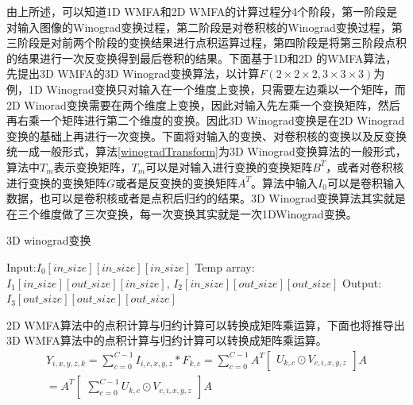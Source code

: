 由上所述，可以知道1D WMFA和2D WMFA的计算过程分4个阶段，第一阶段是对输入图像的Winograd变换过程，第二阶段是对卷积核的Winograd变换过程，第三阶段是对前两个阶段的变换结果进行点积运算过程，第四阶段是将第三阶段点积的结果进行一次反变换得到最后卷积的结果。下面基于1D和2D 的WMFA算法，先提出3D WMFA的3D Winograd变换算法，以计算$F(2\times 2 \times 2, 3 \times 3\times 3)$为例，1D Winograd变换只对输入在一个维度上变换，只需要左边乘以一个矩阵，而2D Winorad变换需要在两个维度上变换，因此对输入先左乘一个变换矩阵，然后再右乘一个矩阵进行第二个维度的变换。因此3D Winograd变换是在2D Winograd变换的基础上再进行一次变换。下面将对输入的变换、对卷积核的变换以及反变换统一成一般形式，算法\ref{winogradTransform}为3D Winograd变换算法的一般形式，算法中$T_m$表示变换矩阵，$T_m$可以是对输入进行变换的变换矩阵$B^T$，或者对卷积核进行变换的变换矩阵$G$或者是反变换的变换矩阵$A^T$。算法中输入$I_0$可以是卷积输入数据，也可以是卷积核或者是点积后归约的结果。3D Winograd变换算法其实就是在三个维度做了三次变换，每一次变换其实就是一次1DWinograd变换。
\begin{algorithm}
\caption{3D winograd变换}
\label{winogradTransform}
\begin{algorithmic}
\STATE Input:$I_0[in\_size][in\_size][in\_size]$ 
\STATE Temp array: $I_1[in\_size][out\_size][in\_size]$, $I_2[in\_size][out\_size][out\_size]$
\STATE Output: $I_3[out\_size][out\_size][out\_size]$
	\ENDFOR
\ENDFOR

	\ENDFOR
\ENDFOR

	\ENDFOR
\ENDFOR
\end{algorithmic}
\end{algorithm}

2D WMFA算法中的点积计算与归约计算可以转换成矩阵乘运算，下面也将推导出3D WMFA算法中的点积计算与归约计算可以转换成矩阵乘运算。
\begin{equation}
\begin{split}
Y_{i,x,y,z,k} = \sum_{c=0}^{C-1}I_{i,c,x,y,z}\ast F_{k,c} = \sum_{c=0}^{C-1}A^T\begin{bmatrix}
U_{k,c}\odot V_{c,i,x,y,z}
\end{bmatrix}A \\
= A^T\begin{bmatrix}
\sum_{c=0}^{C-1}U_{k,c}\odot V_{c,i,x,y,z}
\end{bmatrix}A
\end{split}
\end{equation}

